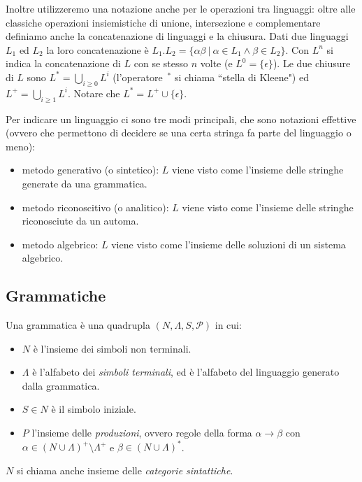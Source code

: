 \documentclass[12pt]{article}
\numberwithin{theorem}{subsection}
\begin{document}
Inoltre utilizzeremo una notazione anche per le operazioni tra linguaggi: oltre alle classiche operazioni insiemistiche di unione, intersezione e complementare definiamo anche la concatenazione di linguaggi e la chiusura. Dati due linguaggi $L_1$ ed $L_2$ la loro concatenazione è $L_1 . L_2 = \{ \alpha \beta \ \vert \ \alpha \in L_1 \land \beta \in L_2 \}$. Con $L^n$ si indica la concatenazione di $L$ con se stesso $n$ volte (e $L^0 = \{ \epsilon \}$). Le due chiusure di $L$ sono $L^* = \bigcup\limits_{i \ge 0} L^i$ (l'operatore $\,^*$ si chiama ``stella di Kleene") ed $L^+ = \bigcup\limits_{i \ge 1} L^i$. Notare che $L^* = L^+ \cup \{ \epsilon \}$.

Per indicare un linguaggio ci sono tre modi principali, che sono notazioni effettive (ovvero che permettono di decidere se una certa stringa fa parte del linguaggio o meno):
\begin{itemize}
	\item metodo generativo (o sintetico): $L$ viene visto come l'insieme delle stringhe generate da una grammatica.
	\item metodo riconoscitivo (o analitico): $L$ viene visto come l'insieme delle stringhe riconosciute da un automa.
	\item metodo algebrico: $L$ viene visto come l'insieme delle soluzioni di un sistema algebrico.
\end{itemize}

\newpage
\subsection{Grammatiche}
\begin{definition}[Grammatica]
	Una grammatica è una quadrupla $(N, \Lambda, S, \mathcal{P})$ in cui:
	\begin{itemize}
		\item $N$ è l'insieme dei simboli non terminali.
		\item $\Lambda$ è l'alfabeto dei \textit{simboli terminali}, ed è l'alfabeto del linguaggio generato dalla grammatica.
		\item $S \in N$ è il simbolo iniziale.
		\item $P$ l'insieme delle \textit{produzioni}, ovvero regole della forma $\alpha \rightarrow \beta$ con $\alpha\in (N \cup \Lambda)^+ \setminus \Lambda^+$ e $\beta \in (N \cup \Lambda)^*$.
	\end{itemize}
	$N$ si chiama anche insieme delle \textit{categorie sintattiche}.
\end{definition}
\end{document}
